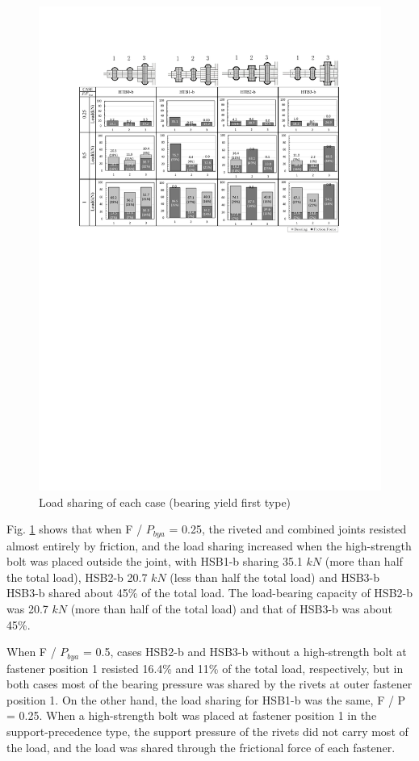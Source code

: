 \begin{figure}[htbp]
    \centering
    \includegraphics[width=\textwidth]{imgs/ch4/fig18.pdf}
    \caption{Load sharing of each case (bearing yield first type)}
    \label{ch4fig18}
\end{figure}

Fig. \ref{ch4fig18} shows that when F / $P_{bya}$ = 0.25, the riveted and combined joints resisted almost entirely by friction, and the load sharing increased when the high-strength bolt was placed outside the joint, with HSB1-b sharing 35.1 $kN$ (more than half the total load), HSB2-b 20.7 $kN$ (less than half the total load) and HSB3-b HSB3-b shared about 45\% of the total load. The load-bearing capacity of HSB2-b was 20.7 $kN$ (more than half of the total load) and that of HSB3-b was about 45\%.

When F / $P_{bya}$ = 0.5, cases HSB2-b and HSB3-b without a high-strength bolt at fastener position 1 resisted 16.4\% and 11\% of the total load, respectively, but in both cases most of the bearing pressure was shared by the rivets at outer fastener position 1. On the other hand, the load sharing for HSB1-b was the same, F / P = 0.25. When a high-strength bolt was placed at fastener position 1 in the support-precedence type, the support pressure of the rivets did not carry most of the load, and the load was shared through the frictional force of each fastener.

